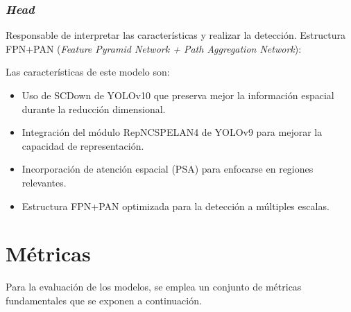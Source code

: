 \documentclass[12pt,a4paper,onecolumn,oneside]{report}
\begin{document}
\subsubsection{\textit{Head}}
Responsable de interpretar las características y realizar la detección. Estructura FPN+PAN (\textit{Feature Pyramid Network + Path Aggregation Network}):

\begin{table}[H]
\caption{Estructura del \textit{head} del modelo personalizado}
\centering
{}
\end{table}

Las características de este modelo son:

\begin{itemize}
  \item Uso de SCDown de YOLOv10 que preserva mejor la información espacial durante la reducción dimensional.
  \item Integración del módulo RepNCSPELAN4 de YOLOv9 para mejorar la capacidad de representación.
  \item Incorporación de atención espacial (PSA) para enfocarse en regiones relevantes.
  \item Estructura FPN+PAN optimizada para la detección a múltiples escalas.
\end{itemize}

\section{Métricas}
\label{sec:Métricas}
Para la evaluación de los modelos, se emplea un conjunto de métricas fundamentales que se exponen a continuación.
\end{document}
